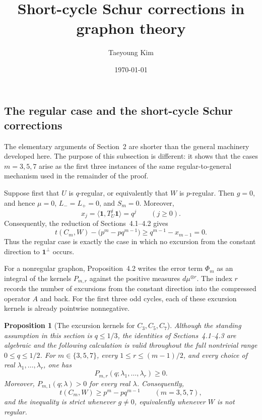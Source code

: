 \documentclass[11pt]{article}
\title{Short-cycle Schur corrections in graphon theory}
\author{Taeyoung Kim}
\date{\today}
\newtheorem{proposition}[theorem]{Proposition}
\begin{document}
\maketitle

\subsection{The regular case and the short-cycle Schur corrections}
\label{subsec:regular-short-schur}

The elementary arguments of Section~2 are shorter than the general machinery developed here.
The purpose of this subsection is different: it shows that the cases
$m=3,5,7$ arise as the first three instances of the same regular-to-general
mechanism used in the remainder of the proof.

Suppose first that $U$ is $q$-regular, or equivalently that $W$ is
$p$-regular. Then $g=0$, and hence $\mu=0$, $L_-=L_+=0$, and $S_m=0$.
Moreover,
\[
 x_j=\langle \mathbf 1,T_U^j\mathbf 1\rangle=q^j
 \qquad (j\ge 0).
\]
Consequently, the reduction of Sections~4.1--4.2 gives
\[
 t(C_m,W)-\bigl(p^m-pq^{m-1}\bigr)
 \ge q^{m-1}-x_{m-1}=0.
\]
Thus the regular case is exactly the case in which no excursion from the
constant direction to $\mathbf 1^\perp$ occurs.

For a nonregular graphon, Proposition~4.2 writes the error term $\Phi_m$ as
an integral of the kernels $P_{m,r}$ against the positive measures
$d\mu^{\otimes r}$.  The index $r$ records the number of excursions from the
constant direction into the compressed operator $A$ and back.  For the first
three odd cycles, each of these excursion kernels is already pointwise
nonnegative.

\begin{proposition}[The excursion kernels for $C_3,C_5,C_7$]
\label{prop:short-cycle-excursion-kernels}
Although the standing assumption in this section is $q\le 1/3$, the
identities of Sections~4.1--4.3 are algebraic and the following calculation
is valid throughout the full nontrivial range $0\le q\le 1/2$.
For $m\in\{3,5,7\}$, every
$1\le r\le (m-1)/2$, and every choice of real
$\lambda_1,\ldots,\lambda_r$, one has
\[
 P_{m,r}(q;\lambda_1,\ldots,\lambda_r)\ge 0.
\]
Moreover, $P_{m,1}(q;\lambda)>0$ for every real $\lambda$.  Consequently,
\[
 t(C_m,W)\ge p^m-pq^{m-1}
 \qquad (m=3,5,7),
\]
and the inequality is strict whenever $g\ne 0$, equivalently whenever $W$
is not regular.
\end{proposition}
\end{document}
